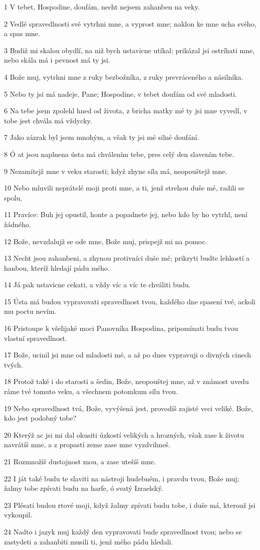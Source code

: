 \par 1 V tebet, Hospodine, doufám, necht nejsem zahanben na veky.
\par 2 Vedlé spravedlnosti své vytrhni mne, a vyprost mne; naklon ke mne ucha svého, a spas mne.
\par 3 Budiž mi skalou obydlí, na niž bych ustavicne utíkal; prikázal jsi ostríhati mne, nebo skála má i pevnost má ty jsi.
\par 4 Bože muj, vytrhni mne z ruky bezbožníka, z ruky prevráceného a násilníka.
\par 5 Nebo ty jsi má nadeje, Pane; Hospodine, v tebet doufám od své mladosti.
\par 6 Na tebe jsem zpolehl hned od života, z bricha matky mé ty jsi mne vyvedl, v tobe jest chvála má vždycky.
\par 7 Jako zázrak byl jsem mnohým, a však ty jsi mé silné doufání.
\par 8 Ó at jsou naplnena ústa má chválením tebe, pres celý den slavením tebe.
\par 9 Nezamítejž mne v veku starosti; když zhyne síla má, neopouštejž mne.
\par 10 Nebo mluvili neprátelé moji proti mne, a ti, jenž strehou duše mé, radili se spolu,
\par 11 Pravíce: Buh jej opustil, honte a popadnete jej, nebo kdo by ho vytrhl, není žádného.
\par 12 Bože, nevzdalujž se ode mne, Bože muj, prispejž mi na pomoc.
\par 13 Necht jsou zahanbeni, a zhynou protivníci duše mé; prikryti budte lehkostí a hanbou, kteríž hledají pádu mého.
\par 14 Já pak ustavicne cekati, a vždy víc a víc te chváliti budu.
\par 15 Ústa má budou vypravovati spravedlnost tvou, každého dne spasení tvé, ackoli mu poctu nevím.
\par 16 Pristoupe k všelijaké moci Panovníka Hospodina, pripomínati budu tvou vlastní spravedlnost.
\par 17 Bože, ucinil jsi mne od mladosti mé, a až po dnes vypravuji o divných cinech tvých.
\par 18 Protož také i do starosti a šedin, Bože, neopouštej mne, až v známost uvedu ráme tvé tomuto veku, a všechnem potomkum sílu tvou.
\par 19 Nebo spravedlnost tvá, Bože, vyvýšená jest, provodíš zajisté veci veliké. Bože, kdo jest podobný tobe?
\par 20 Kterýž ac jsi mi dal okusiti úzkostí velikých a hrozných, však zase k životu navrátíš mne, a z propastí zeme zase mne vyzdvihneš.
\par 21 Rozmnožíš dustojnost mou, a zase utešíš mne.
\par 22 I ját také budu te slaviti na nástroji hudebném, i pravdu tvou, Bože muj; žalmy tobe zpívati budu na harfe, ó svatý Izraelský.
\par 23 Plésati budou rtové moji, když žalmy zpívati budu tobe, i duše má, kterouž jsi vykoupil.
\par 24 Nadto i jazyk muj každý den vypravovati bude spravedlnost tvou; nebo se zastydeti a zahanbiti musili ti, jenž mého pádu hledali.

